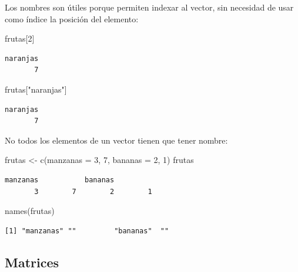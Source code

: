 \documentclass[
]{book}
\newenvironment{Shaded}{\begin{snugshade}}{\end{snugshade}}
\newcommand{\AttributeTok}[1]{\textcolor[rgb]{0.77,0.63,0.00}{#1}}
\newcommand{\DecValTok}[1]{\textcolor[rgb]{0.00,0.00,0.81}{#1}}
\newcommand{\FunctionTok}[1]{\textcolor[rgb]{0.00,0.00,0.00}{#1}}
\newcommand{\NormalTok}[1]{#1}
\newcommand{\OtherTok}[1]{\textcolor[rgb]{0.56,0.35,0.01}{#1}}
\newcommand{\StringTok}[1]{\textcolor[rgb]{0.31,0.60,0.02}{#1}}
\begin{document}
Los nombres son útiles porque permiten indexar al vector, sin necesidad de usar como índice la posición del elemento:

\begin{Shaded}
\begin{Highlighting}[]
\NormalTok{frutas[}\DecValTok{2}\NormalTok{]}
\end{Highlighting}
\end{Shaded}

\begin{verbatim}
naranjas 
       7 
\end{verbatim}

\begin{Shaded}
\begin{Highlighting}[]
\NormalTok{frutas[}\StringTok{"naranjas"}\NormalTok{]}
\end{Highlighting}
\end{Shaded}

\begin{verbatim}
naranjas 
       7 
\end{verbatim}

No todos los elementos de un vector tienen que tener nombre:

\begin{Shaded}
\begin{Highlighting}[]
\NormalTok{frutas }\OtherTok{\textless{}{-}} \FunctionTok{c}\NormalTok{(}\AttributeTok{manzanas =} \DecValTok{3}\NormalTok{, }\DecValTok{7}\NormalTok{, }\AttributeTok{bananas =} \DecValTok{2}\NormalTok{, }\DecValTok{1}\NormalTok{)}
\NormalTok{frutas}
\end{Highlighting}
\end{Shaded}

\begin{verbatim}
manzanas           bananas          
       3        7        2        1 
\end{verbatim}

\begin{Shaded}
\begin{Highlighting}[]
\FunctionTok{names}\NormalTok{(frutas)}
\end{Highlighting}
\end{Shaded}

\begin{verbatim}
[1] "manzanas" ""         "bananas"  ""        
\end{verbatim}

\hypertarget{matrices}{%
\subsection{Matrices}\label{matrices}}
\end{document}
